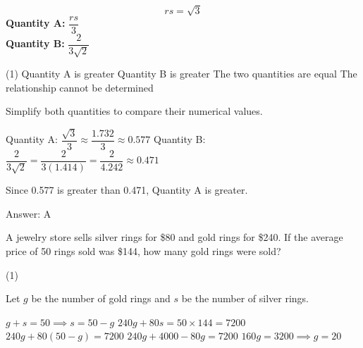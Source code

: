\documentclass[11pt,paper=a4,answers]{exam}
\begin{document}
\begin{questions}
\question
\[ rs = \sqrt{3} \]
\vspace{5pt}
\textbf{Quantity A: } $\dfrac{rs}{3}$ \\
\vspace{5pt}
\textbf{Quantity B: } $\dfrac{2}{3\sqrt{2}}$

\begin{tasks}(1)
\task[A)] Quantity A is greater
\task[B)] Quantity B is greater
\task[C)] The two quantities are equal
\task[D)] The relationship cannot be determined
\end{tasks}

\begin{solution}
Simplify both quantities to compare their numerical values.
\vspace{5pt}
\begin{center}
Quantity A: $\dfrac{\sqrt{3}}{3} \approx \dfrac{1.732}{3} \approx 0.577$
\vspace{5pt}
Quantity B: $\dfrac{2}{3\sqrt{2}} = \dfrac{2}{3(1.414)} = \dfrac{2}{4.242} \approx 0.471$
\end{center}
\vspace{5pt}
Since 0.577 is greater than 0.471, Quantity A is greater.

Answer: \colorbox{yellow!100}{A}
\end{solution}

\vspace{1cm}


\question
A jewelry store sells silver rings for \$80 and gold rings for \$240. If the average price of 50 rings sold was \$144, how many gold rings were sold?

\begin{tasks}(1)
    
\end{tasks}

\begin{solution}
Let $g$ be the number of gold rings and $s$ be the number of silver rings.
\vspace{5pt}
\begin{center}
$g + s = 50 \implies s = 50 - g$
\vspace{5pt}
$240g + 80s = 50 \times 144 = 7200$
\vspace{5pt}
$240g + 80(50 - g) = 7200$
\vspace{5pt}
$240g + 4000 - 80g = 7200$
\vspace{5pt}
$160g = 3200 \implies g = 20$
\end{center}


\end{solution}
\end{questions}
\end{document}
